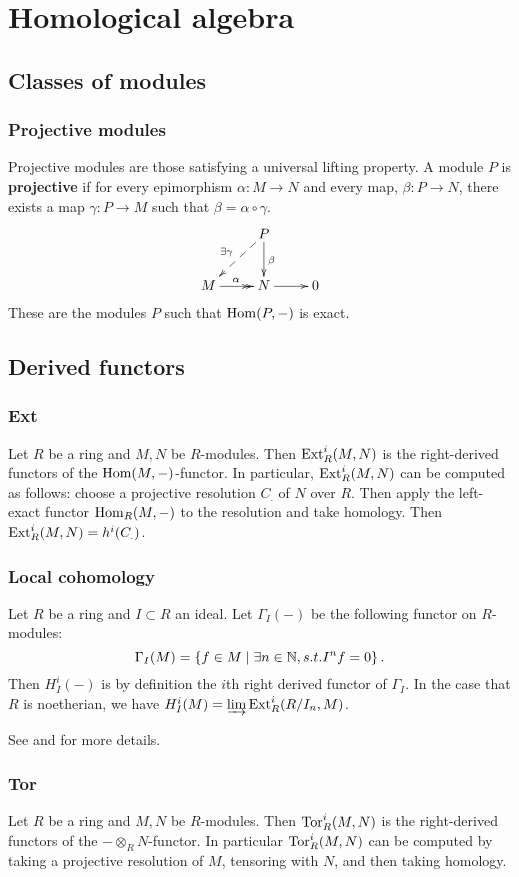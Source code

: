 \documentclass[11pt, english]{article}
\begin{document}
\section{Homological algebra}
\subsection{Classes of modules}
\subsubsection{Projective modules}
\label{projectivemodules}
Projective modules are those satisfying a universal lifting property. A module $P$ is \textbf{projective} if for every epimorphism $\alpha:M \to N$ and every map, $\beta:P \to N$, there exists a map $\gamma:P \to M$ such that $\beta = \alpha \circ \gamma$.
\[
\xymatrix{
 & P \ar@{-->}[dl]_{\exists\gamma} \ar[d]^\beta \\
M \ar@{->>}[r]^\alpha & N \ar[r] & 0
}
\]
These are the modules $P$ such that $\operatorname{Hom}(P,-)$ is exact.

\subsection{Derived functors}
\subsubsection{Ext}
\label{ext}
Let $R$ be a ring and $M,N$ be $R$-modules. Then $\operatorname{\mathrm{Ext}}_R^i(M,N)$ is the right-derived functors of the $\operatorname{Hom}(M,-)$-functor. In particular, $\operatorname{\mathrm{Ext}}^i_R(M,N)$ can be computed as follows: choose a projective resolution $C_.$ of $N$ over $R$. Then apply the left-exact functor $\operatorname{Hom}_R(M,-)$ to the resolution and take homology. Then $\operatorname{\mathrm{Ext}}_R^i(M,N)=h^i(C_.)$.

\subsubsection{Local cohomology}
\label{localcohomology}
Let $R$ be a ring and $I \subset R$ an ideal. Let $\Gamma_I(-)$ be the following functor on $R$-modules:
\[
\Gamma_I(M) = \left\{ f \in M \mid \exists n \in \mathbb{N}, s.t. I^n f = 0 \right \}.
\]
Then $H_I^i(-)$ is by definition the $i$th right derived functor of $\Gamma_I$.  In the case that $R$ is noetherian, we have $H_I^i(M) = \varinjlim \operatorname{\mathrm{Ext}}^i_R(R/I_n,M)$.

See \cite{eisenbud} and \cite{weibel} for more details. 

\subsubsection{Tor}
\label{tor}
Let $R$ be a ring and $M,N$ be $R$-modules. Then $\operatorname{\mathrm{Tor}}_R^i(M,N)$ is the right-derived functors of the $- \otimes_R N$-functor. In particular $\operatorname{\mathrm{Tor}}_R^i(M,N)$ can be computed by taking a projective resolution of $M$, tensoring with $N$, and then taking homology.
\end{document}

